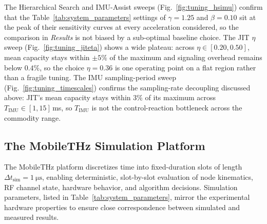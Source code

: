 \documentclass[fleqn,10pt]{wlscirep}
\begin{document}
{The Hierarchical Search and IMU-Assist sweeps (Fig.~\ref{fig:tuning_hsimu}) confirm that the Table~\ref{tab:system_parameters} settings of $\gamma = 1.25$ and $\beta = 0.10$ sit at the peak of their sensitivity curves at every acceleration considered, so the comparison in \emph{Results} is not biased by a sub-optimal baseline choice. The JIT $\eta$ sweep (Fig.~\ref{fig:tuning_jiteta}) shows a wide plateau: across $\eta \in [0.20, 0.50]$, mean capacity stays within $\pm 5\%$ of the maximum and signaling overhead remains below $0.4\%$, so the choice $\eta = 0.36$ is one operating point on a flat region rather than a fragile tuning. The IMU sampling-period sweep (Fig.~\ref{fig:tuning_timescales}) confirms the sampling-rate decoupling discussed above: JIT's mean capacity stays within $3\%$ of its maximum across $T_{\text{IMU}} \in [1, 15]$\,ms, so $T_{\text{IMU}}$ is not the control-reaction bottleneck across the commodity range.
}



\subsection*{The MobileTHz Simulation Platform}
The MobileTHz platform discretizes time into fixed-duration slots of length $\Delta t_{\text{sim}} = \SI{1}{\micro\second}$, enabling deterministic, slot-by-slot evaluation of node kinematics, RF channel state, hardware behavior, and algorithm decisions. Simulation parameters, listed in Table~\ref{tab:system_parameters}, mirror the experimental hardware properties to ensure close correspondence between simulated and measured results.
\end{document}
